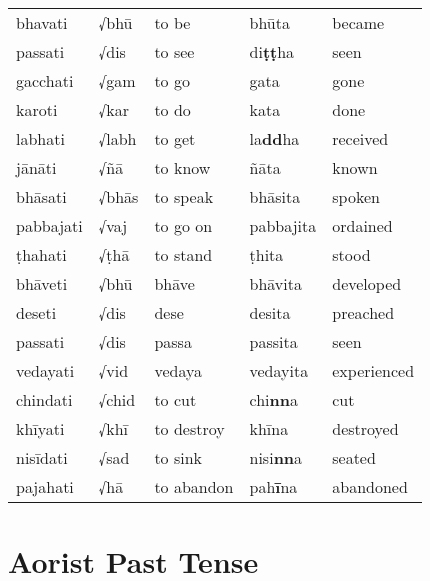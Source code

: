 \documentclass[11pt,oneside]{memoir}
\begin{document}
\begin{center}
\begin{tabular}{lllll}
bhavati & √bhū & to be & bhūta & became\\[0pt]
passati & √dis & to see & di\textbf{ṭṭ}ha & seen\\[0pt]
gacchati & √gam & to go & gata & gone\\[0pt]
karoti & √kar & to do & kata & done\\[0pt]
labhati & √labh & to get & la\textbf{dd}ha & received\\[0pt]
jānāti & √ñā & to know & ñāta & known\\[0pt]
bhāsati & √bhās & to speak & bhāsita & spoken\\[0pt]
pabbajati & √vaj & to go on & pabbajita & ordained\\[0pt]
ṭhahati & √ṭhā & to stand & ṭhita & stood\\[0pt]
bhāveti & √bhū & bhāve & bhāvita & developed\\[0pt]
deseti & √dis & dese & desita & preached\\[0pt]
passati & √dis & passa & passita & seen\\[0pt]
vedayati & √vid & vedaya & vedayita & experienced\\[0pt]
chindati & √chid & to cut & chi\textbf{nn}a & cut\\[0pt]
khīyati & √khī & to destroy & khīna & destroyed\\[0pt]
nisīdati & √sad & to sink & nisi\textbf{nn}a & seated\\[0pt]
pajahati & √hā & to abandon & pah\textbf{ī}na & abandoned\\[0pt]
\end{tabular}
\end{center}

\clearpage

\section{Aorist Past Tense}
\label{sec:org03266ab}
\end{document}
